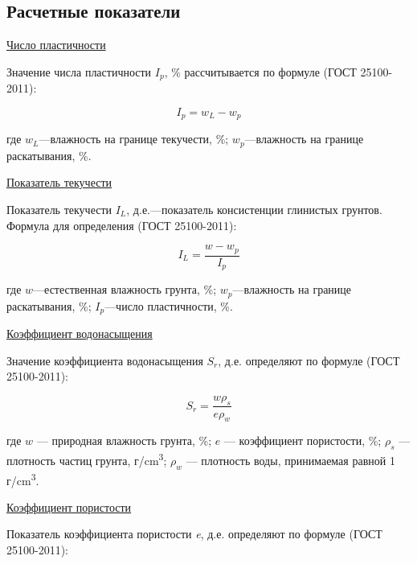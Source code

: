 
\subsection{Расчетные показатели}

\underline{Число пластичности}

 Значение числа пластичности $I_p$, \% рассчитывается по формуле (ГОСТ 25100-2011):

 \[
    I_p = w_L-w_p
 \]

 где $w_L$---влажность на границе текучести, \%;
 $w_p$---влажность на границе раскатывания, \%.
 
\underline{Показатель текучести}

 Показатель текучести \textit{$I_L$}, д.е.---показатель консистенции глинистых грунтов.
 Формула для определения (ГОСТ 25100-2011): 

\[
   I_L = \frac{w-w_p}{I_p}
\]

где $w$---естественная влажность грунта, \%;
$w_p$---влажность на границе раскатывания, \%;
$I_p$---число пластичности, \%.

\underline{Коэффициент водонасыщения}

Значение коэффициента водонасыщения \textit{$S_r$}, д.е. определяют по формуле (ГОСТ 25100-2011):

\[
   S_r = \frac{w \rho_s}{e \rho_w}
\]

где $w$ --- природная влажность грунта, \%;
$e$ --- коэффициент пористости, \%;
$\rho_s$ --- плотность частиц грунта, г/\si{\centi\meter^3};
$\rho_w$ --- плотность воды, принимаемая равной 1 г/\si{\centi\meter^3}.

\underline{Коэффициент пористости}

Показатель коэффициента пористости  \textit{e}, д.е. определяют по формуле (ГОСТ 25100-2011): 

